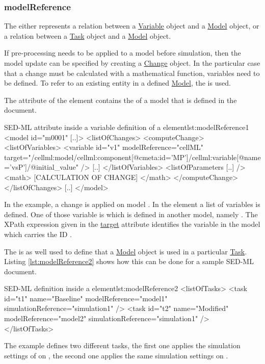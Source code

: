 \subsubsection{modelReference}
\label{sec:modelReference}
%
The  either represents a relation between a \hyperref[class:variable]{Variable} object and a \hyperref[class:Model]{Model} object, or  a relation between a \hyperref[class:task]{Task} object and a \hyperref[class:Model]{Model} object.

If pre-processing needs to be applied to a model before simulation, then the model update can be specified by creating a \hyperref[class:Change]{Change} object. In the particular case that a change must be calculated with a mathematical function, variables need to be defined. To refer to an existing entity in a defined \hyperref[class:model]{Model}, the  is used. 

The  attribute of the  element contains the  of a model that is defined in the document. 
%
\begin{myXmlLst}{SED-ML  attribute inside a variable definition of a   element}{lst:modelReference1}
<model id="m0001" [..]>
 <listOfChanges>
   <computeChange>
    <listOfVariables>
     <variable id="v1" modelReference="cellML" target="/cellml:model/cellml:component[@cmeta:id='MP']/cellml:variable[@name='vsP']/@initial_value" />
     [..]
    </listOfVariables>
    <listOfParameters [..] />
    <math>
     [CALCULATION OF CHANGE]
    </math>
   </computeChange>
 </listOfChanges>
 [..]
</model>
\end{myXmlLst}
%
In the example, a change is  applied on model . In the  element a list of variables is defined. One of those variable is  which is defined in another model, namely . 
The XPath expression given in the \hyperref[sec:target]{target} attribute identifies the variable in the model which carries the ID .

The  is as well used to define that a \hyperref[class:model]{Model} object is used in a particular  \hyperref[class:task]{Task}. Listing \ref{lst:modelReference2} shows how this can be done for a sample SED-ML document.
%
\begin{myXmlLst}{SED-ML  definition inside a  element}{lst:modelReference2}
<listOfTasks>
 <task id="t1" name="Baseline" modelReference="model1" simulationReference="simulation1" />
 <task id="t2" name="Modified" modelReference="model2" simulationReference="simulation1" />
</listOfTasks>
\end{myXmlLst}
%
The example defines two different tasks, the first one applies the simulation settings of  on , the second one applies the same simulation settings on .


